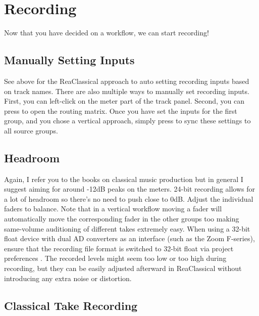 \documentclass[10pt,american]{article}
\begin{document}
\section{Recording}

Now that you have decided on a workflow, we can start recording!

\subsection{Manually Setting Inputs}

See above for the ReaClassical approach to auto setting recording inputs based
on track names. There are also multiple ways to manually set recording inputs.
First, you can left-click on the meter part of the track panel. Second, you can
press  to open the routing matrix. Once you have set the inputs for
the first group, and you chose a vertical approach, simply press  to
sync these settings to all source groups.

\subsection{Headroom}

Again, I refer you to the books on classical music production but in general I
suggest aiming for around -12dB peaks on the meters. 24-bit recording allows for
a lot of headroom so there's no need to push close to 0dB. Adjust the individual
faders to balance. Note that in a vertical workflow moving a fader will
automatically move the corresponding fader in the other groups too making
same-volume auditioning of different takes extremely easy. When using a 32-bit
float device with dual AD converters as an interface (such as the Zoom
F-series), ensure that the recording file format is switched to 32-bit float via
project preferences . The recorded levels might seem too low or too high
during recording, but they can be easily adjusted afterward in ReaClassical
without introducing any extra noise or distortion.

\subsection{Classical Take Recording}
\end{document}
